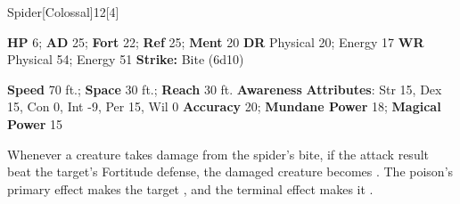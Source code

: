   
  \begin{monsection}{Spider}[Colossal]{12}[4]
    \vspace{-1em}\vspace{-1em}
    \begin{spellcontent}
      \begin{spelltargetinginfo}
        \pari \textbf{HP} 6;
          \textbf{AD} 25;
          \textbf{Fort} 22;
          \textbf{Ref} 25;
          \textbf{Ment} 20
        \pari \textbf{DR} Physical 20; Energy 17
        \pari \textbf{WR} Physical 54; Energy 51
        \pari \textbf{Strike:}
            Bite  (6d10)
      \end{spelltargetinginfo}
    \end{spellcontent}
    \begin{monsterfooter}
      \pari \textbf{Speed} 70 ft.;
        \textbf{Space} 30 ft.;
        \textbf{Reach} 30 ft.
      \pari \textbf{Awareness} 
      \pari \textbf{Attributes}:
        Str 15, Dex 15, Con 0,
        Int -9, Per 15, Wil 0
      \pari \textbf{Accuracy} 20;
        \textbf{Mundane Power} 18;
      \textbf{Magical Power} 15
    \end{monsterfooter}
  \end{monsection}
        Whenever a creature takes damage from the spider's bite,
          if the attack result beat the target's Fortitude defense,
          the damaged creature becomes .
        The poison's primary effect makes the target ,
          and the terminal effect makes it .
  
